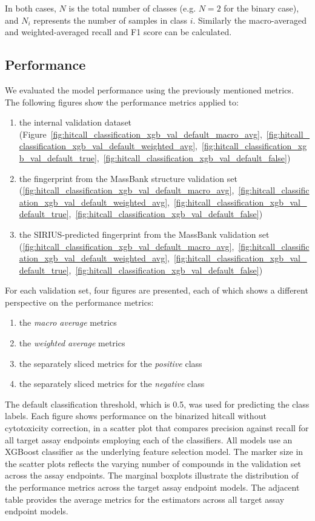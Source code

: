 In both cases, $N$ is the total number of classes (e.g. $N=2$ for the binary case), and $N_i$ represents the number of samples in class $i$. Similarly the macro-averaged and weighted-averaged recall and F1 score can be calculated.



\subsection{Performance}
We evaluated the model performance using the previously mentioned metrics. The following figures show the performance metrics applied to:

\begin{enumerate}
  \item the internal validation dataset (Figure~\ref{fig:hitcall_classification_xgb_val_default_macro_avg},~\ref{fig:hitcall_classification_xgb_val_default_weighted_avg},~\ref{fig:hitcall_classification_xgb_val_default_true},~\ref{fig:hitcall_classification_xgb_val_default_false})
  \item the fingerprint from the MassBank structure validation set (\ref{fig:hitcall_classification_xgb_val_default_macro_avg},~\ref{fig:hitcall_classification_xgb_val_default_weighted_avg},~\ref{fig:hitcall_classification_xgb_val_default_true},~\ref{fig:hitcall_classification_xgb_val_default_false})
  \item the SIRIUS-predicted fingerprint from the MassBank validation set (\ref{fig:hitcall_classification_xgb_val_default_macro_avg},~\ref{fig:hitcall_classification_xgb_val_default_weighted_avg},~\ref{fig:hitcall_classification_xgb_val_default_true},~\ref{fig:hitcall_classification_xgb_val_default_false})
\end{enumerate}

For each validation set, four figures are presented, each of which shows a different perspective on the performance metrics:

\begin{enumerate}
  \item the \emph{macro average} metrics
  \item the \emph{weighted average} metrics
  \item the separately sliced metrics for the \emph{positive} class
  \item the separately sliced metrics for the \emph{negative} class
\end{enumerate}

The default classification threshold, which is 0.5, was used for predicting the class labels. Each figure shows performance on the binarized hitcall without cytotoxicity correction, in a scatter plot that compares precision against recall for all target assay endpoints employing each of the classifiers. All models use an XGBoost classifier as the underlying feature selection model. The marker size in the scatter plots reflects the varying number of compounds in the validation set across the assay endpoints. The marginal boxplots illustrate the distribution of the performance metrics across the target assay endpoint models. The adjacent table provides the average metrics for the estimators across all target assay endpoint models.


